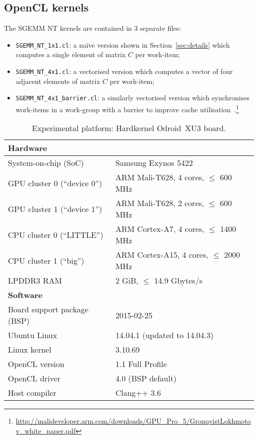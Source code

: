\documentclass{acm_proc_article-sp} %
\begin{document}
\subsection{OpenCL kernels}

The SGEMM NT kernels are contained in 3 separate files:
%
\begin{itemize}

  \item \verb|SGEMM_NT_1x1.cl|: a na\"ive version shown in
  Section~\ref{sec:details} which computes a single element of matrix $C$ per
  work-item;

  \item \verb|SGEMM_NT_4x1.cl|: a vectorised version which computes a vector of
  four adjacent elements of matrix $C$ per work-item;

  \item \verb|SGEMM_NT_4x1_barrier.cl|: a similarly vectorised version which
  synchronises work-items in a work-group with a barrier to improve cache
  utilisation~\cite{Gronqvist:2014}.\footnote{\url{http://malideveloper.arm.com/downloads/GPU_Pro_5/GronqvistLokhmotov_white_paper.pdf}}

\end{itemize}
%

\begin{table*}
\centering
\caption{\label{Odroid}Experimental platform: Hardkernel Odroid~XU3 board.}
  \begin{tabular}{ll}
  \toprule
  {\bf Hardware}   &\\
  \midrule
  System-on-chip (SoC)         & Samsung Exynos 5422                     \\
  GPU cluster 0 (``device 0'') & ARM Mali-T628,  4 cores, $\le$ 600 MHz  \\
  GPU cluster 1 (``device 1'') & ARM Mali-T628,  2 cores, $\le$ 600 MHz  \\
  CPU cluster 0 (``LITTLE'')   & ARM Cortex-A7,  4 cores, $\le$ 1400 MHz \\
  CPU cluster 1 (``big'')      & ARM Cortex-A15, 4 cores, $\le$ 2000 MHz \\
  LPDDR3 RAM                   & 2 GiB, $\le$ 14.9 Gbytes/s              \\
  \midrule
  {\bf Software}   &\\
  \midrule
  Board support package (BSP)  & 2015-02-25                    \\
  Ubuntu Linux                 & 14.04.1 (updated to 14.04.3)  \\
  Linux kernel                 & 3.10.69                       \\
  OpenCL version               & 1.1 Full Profile              \\
  OpenCL driver                & 4.0 (BSP default)             \\
  Host compiler                & Clang++ 3.6                   \\
  \bottomrule
  \end{tabular}
\end{table*}
\end{document}
